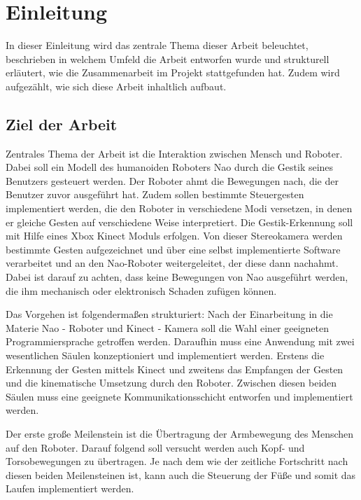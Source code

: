 \chapter{Einleitung}      %

In dieser Einleitung wird das zentrale Thema dieser Arbeit beleuchtet, beschrieben in welchem Umfeld die Arbeit entworfen wurde und strukturell erläutert, wie die Zusammenarbeit im Projekt stattgefunden hat. Zudem wird aufgezählt, wie sich diese Arbeit inhaltlich aufbaut.

\section{Ziel der Arbeit}
Zentrales Thema der Arbeit ist die Interaktion zwischen Mensch und Roboter. Dabei soll ein Modell des humanoiden Roboters Nao durch die Gestik seines Benutzers gesteuert werden. Der Roboter ahmt die Bewegungen nach, die der Benutzer zuvor ausgeführt hat. Zudem sollen bestimmte Steuergesten implementiert werden, die den Roboter in verschiedene Modi versetzen, in denen er gleiche Gesten auf verschiedene Weise interpretiert. Die Gestik-Erkennung soll mit Hilfe eines Xbox Kinect Moduls erfolgen. Von dieser Stereokamera werden bestimmte Gesten aufgezeichnet und über eine selbst implementierte Software verarbeitet und an den Nao-Roboter weitergeleitet, der diese dann nachahmt. Dabei ist darauf zu achten, dass keine Bewegungen von Nao ausgeführt werden, die ihm mechanisch oder elektronisch Schaden zufügen können.

Das Vorgehen ist folgendermaßen strukturiert: Nach der Einarbeitung in die Materie Nao - Roboter und Kinect - Kamera soll die Wahl einer geeigneten Programmiersprache getroffen werden. Daraufhin muss eine  Anwendung mit zwei wesentlichen Säulen konzeptioniert und implementiert werden. Erstens die Erkennung der Gesten mittels Kinect und zweitens das Empfangen der Gesten und die kinematische Umsetzung durch den Roboter. Zwischen diesen beiden Säulen muss eine geeignete Kommunikationsschicht entworfen und implementiert werden.	\done{}

Der erste große Meilenstein ist die Übertragung der Armbewegung des Menschen auf den Roboter. Darauf folgend soll versucht werden auch Kopf- und Torsobewegungen zu übertragen. Je nach dem wie der zeitliche Fortschritt nach diesen beiden Meilensteinen ist, kann auch die Steuerung der Füße und somit das Laufen implementiert werden.


